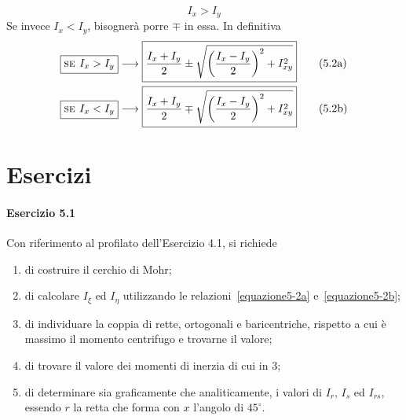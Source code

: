 \begin{equation*}
\boxed{I_{x} > I_{y}}
\end{equation*}
Se invece $I_{x}<I_{y}$, bisognerà porre $\mp$ in essa. In definitiva 
\begin{align}
\boxed{\textup{\textsc{se }}I_{x} > I_{y}} &\longrightarrow \boxed{\frac{I_{x}+I_{y}}{2} \pm \sqrt{\biggl(\frac{I_{x}-I_{y}}{2}\biggr)^{2}+I_{xy}^{2}}}\tag{5.2a} \label{equazione5-2a} \\
\boxed{\textup{\textsc{se }}I_{x} < I_{y}} &\longrightarrow \boxed{\frac{I_{x}+I_{y}}{2} \mp \sqrt{\biggl(\frac{I_{x}-I_{y}}{2}\biggr)^{2}+I_{xy}^{2}}} \tag{5.2b} \label{equazione5-2b}
\end{align}
\clearpage
\section{Esercizi}
\paragraph{Esercizio 5.1}

\noindent Con riferimento al profilato dell'Esercizio 4.1, si richiede
\begin{enumerate}
\item di costruire il cerchio di Mohr;
\item di calcolare $I_{\xi}$ ed $I_{\eta}$ utilizzando le relazioni~\eqref{equazione5-2a} e~\eqref{equazione5-2b};
\item di individuare la coppia di rette, ortogonali e baricentriche, rispetto a cui è massimo il momento centrifugo e trovarne il valore;
\item di trovare il valore dei momenti di inerzia di cui in 3;
\item di determinare sia graficamente che analiticamente, i valori di $I_r$, $I_s$ ed $I_{rs}$, essendo $r$ la retta che forma con $x$ l'angolo di $45^{\circ}$.
\end{enumerate}

